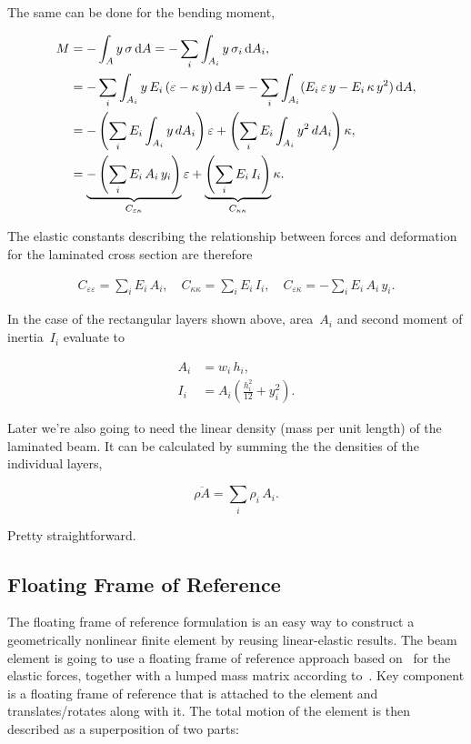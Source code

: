 The same can be done for the bending moment,

\begin{align}
M &= -\int_A y\,\sigma\,\mathrm{d}A = -\sum_i\int_{A_i}y\,\sigma_i\,\mathrm{d}A_i,\notag\\
&= -\sum_i\int_{A_i}y\,E_i\,(\varepsilon - \kappa\,y)\,\mathrm{d}A = -\sum_i\int_{A_i}(E_i\,\varepsilon\,y - E_i\,\kappa\,y^2)\,\mathrm{d}A,\notag\\
&= -\left(\sum_i E_i\int_{A_i}y\,dA_{i}\right)\varepsilon + \left(\sum_i E_i\int_{A_i}y^2\,dA_i\right)\kappa,\notag\\
&=
\underbrace{
-\left(\sum_i E_i\,A_i\,y_i\right)
}_{C_{\varepsilon\kappa}}
\varepsilon +
\underbrace{
\left(\sum_i E_i\,I_{i}\right)
}_{C_{\kappa\kappa}}
\kappa.\label{eq:elements:beam:constitutive_2}
\end{align}

The elastic constants describing the relationship between forces and deformation for the laminated cross section are therefore

\begin{align}
C_{\varepsilon\varepsilon} = \sum_i E_i\,A_i,\quad
C_{\kappa\kappa} = \sum_i E_i\,I_{i},\quad
C_{\varepsilon\kappa} = -\sum_i E_i\,A_i\,y_i.
\end{align}

In the case of the rectangular layers shown above, area~$A_i$ and second moment of inertia~$I_i$ evaluate to

\begin{align}
A_i &= w_i\,h_i,\\
I_i &= A_i\left(\frac{h_i^2}{12} + y_i^2\right).
\end{align}

Later we're also going to need the linear density (mass per unit length) of the laminated beam. It can be calculated by summing the the densities of the individual layers,

\begin{equation}
\overline{\rho A} = \sum_i \rho_i\,A_i.\label{eq:beam-linear-density}
\end{equation}

Pretty straightforward.

\newpage

\subsection{Floating Frame of Reference}

The floating frame of reference formulation is an easy way to construct a geometrically nonlinear finite element by reusing linear-elastic results.
The beam element is going to use a floating frame of reference approach based on~\cite{bib:beam_element_1} for the elastic forces, together with a lumped mass matrix according to~\cite{bib:beam_element_2}.
Key component is a floating frame of reference that is attached to the element and translates/rotates along with it.
The total motion of the element is then described as a superposition of two parts:

